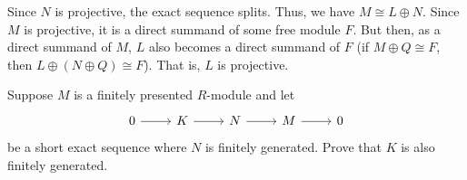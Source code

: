 \documentclass[12 pt, letterpaper]{hmcpset}
\begin{document}
\begin{solution}
	Since $N$ is projective, the exact sequence splits. Thus, we have $M \cong L \oplus N$. Since $M$ is projective, it is a direct summand of some free module $F$. But then, as a direct summand of $M$, $L$ also becomes a direct summand of $F$ (if $M \oplus Q \cong F$, then $L \oplus (N \oplus Q) \cong F$). That is, $L$ is projective.
\end{solution}

\pagebreak

\begin{problem}[5.]
	Suppose $M$ is a finitely presented $R$-module and let
	\[
		\begin{tikzcd}
			0 \ar[r] & K \ar[r] & N \ar[r] & M \ar[r] & 0
		\end{tikzcd}
	\]
	be a short exact sequence where $N$ is finitely generated. Prove that $K$ is also finitely generated.
\end{problem}
\end{document}
